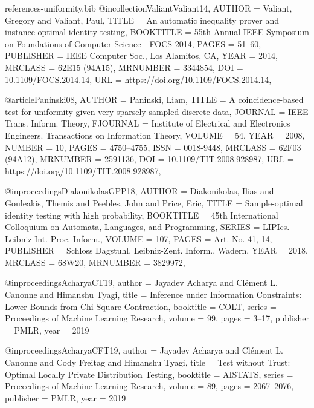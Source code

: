 \documentclass[10pt]{article}
\begin{document}
\begin{filecontents}{references-uniformity.bib}
@incollection{ValiantValiant14,
    AUTHOR = {Valiant, Gregory and Valiant, Paul},
     TITLE = {An automatic inequality prover and instance optimal identity
              testing},
 BOOKTITLE = {55th {A}nnual {IEEE} {S}ymposium on {F}oundations of
              {C}omputer {S}cience---{FOCS} 2014},
     PAGES = {51--60},
 PUBLISHER = {IEEE Computer Soc., Los Alamitos, CA},
      YEAR = {2014},
   MRCLASS = {62E15 (94A15)},
  MRNUMBER = {3344854},
       DOI = {10.1109/FOCS.2014.14},
       URL = {https://doi.org/10.1109/FOCS.2014.14},
}

@article{Paninski08,
    AUTHOR = {Paninski, Liam},
     TITLE = {A coincidence-based test for uniformity given very sparsely
              sampled discrete data},
   JOURNAL = {IEEE Trans. Inform. Theory},
  FJOURNAL = {Institute of Electrical and Electronics Engineers.
              Transactions on Information Theory},
    VOLUME = {54},
      YEAR = {2008},
    NUMBER = {10},
     PAGES = {4750--4755},
      ISSN = {0018-9448},
   MRCLASS = {62F03 (94A12)},
  MRNUMBER = {2591136},
       DOI = {10.1109/TIT.2008.928987},
       URL = {https://doi.org/10.1109/TIT.2008.928987},
}

@inproceedings{DiakonikolasGPP18,
    AUTHOR = {Diakonikolas, Ilias and Gouleakis, Themis and Peebles, John
              and Price, Eric},
     TITLE = {Sample-optimal identity testing with high probability},
 BOOKTITLE = {45th {I}nternational {C}olloquium on {A}utomata, {L}anguages,
              and {P}rogramming},
    SERIES = {LIPIcs. Leibniz Int. Proc. Inform.},
    VOLUME = {107},
     PAGES = {Art. No. 41, 14},
 PUBLISHER = {Schloss Dagstuhl. Leibniz-Zent. Inform., Wadern},
      YEAR = {2018},
   MRCLASS = {68W20},
  MRNUMBER = {3829972},
}

@inproceedings{AcharyaCT19,
  author    = {Jayadev Acharya and
               Cl{\'{e}}ment L. Canonne and
               Himanshu Tyagi},
  title     = {Inference under Information Constraints: Lower Bounds from Chi-Square
               Contraction},
  booktitle = {{COLT}},
  series    = {Proceedings of Machine Learning Research},
  volume    = {99},
  pages     = {3--17},
  publisher = {{PMLR}},
  year      = {2019}
}


@inproceedings{AcharyaCFT19,
  author    = {Jayadev Acharya and
               Cl{\'{e}}ment L. Canonne and
               Cody Freitag and
               Himanshu Tyagi},
  title     = {Test without Trust: Optimal Locally Private Distribution Testing},
  booktitle = {{AISTATS}},
  series    = {Proceedings of Machine Learning Research},
  volume    = {89},
  pages     = {2067--2076},
  publisher = {{PMLR}},
  year      = {2019}
}


\end{filecontents}
\end{document}
